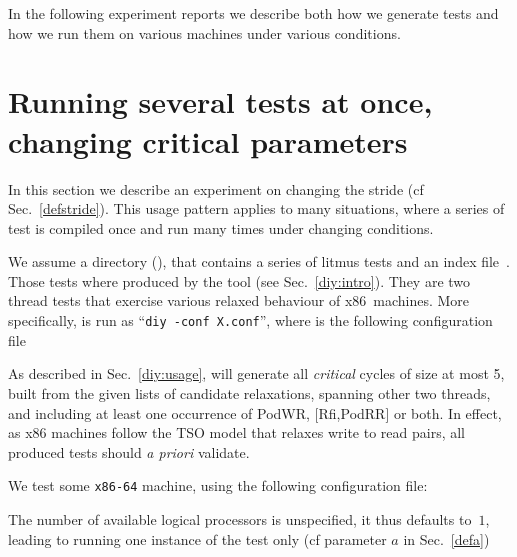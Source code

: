 In the following experiment reports we describe both how we generate tests
and how we run them on various machines under various conditions.

\section{Running several tests at once, changing critical parameters}
In this section we describe an experiment on changing the stride
(cf Sec.~\ref{defstride}).
This usage pattern applies to many situations, where a series of
test is compiled once and run many times under changing conditions.

We assume a directory %
\ifhevea{} ()\fi,
that contains a series of litmus tests
and an index file~.
Those tests where produced by the  tool (see Sec.~\ref{diy:intro}).
They are two thread tests that exercise various relaxed behaviour
of x86~machines.
More specifically, \diy{} is run as ``\texttt{diy -conf X.conf}'',
where  is the
following configuration file

As described in Sec.~\ref{diy:usage}, \diy{} will generate all
\emph{critical} cycles of size at most 5, built from the given lists
of candidate relaxations, spanning other two threads,
and including at least one occurrence of PodWR, [Rfi,PodRR] or both.
In effect, as x86 machines follow the TSO model that relaxes write to read
pairs, all produced tests should \emph{a priori} validate.


We test some \texttt{x86-64} machine, using the following 
 \litmus{} configuration file:

The number of available logical processors is unspecified,
it thus defaults to~$1$,
leading to running one instance of the test only (cf parameter $a$ in Sec.~\ref{defa})

